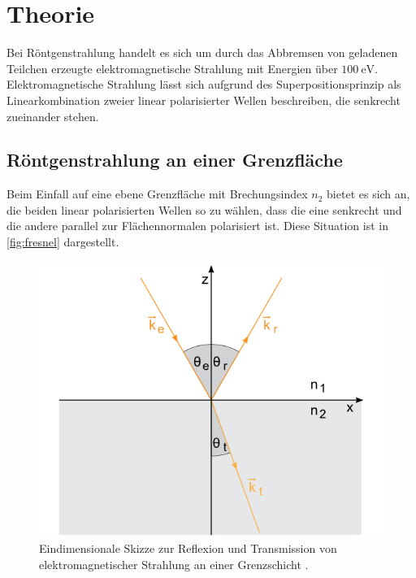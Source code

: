 \section{Theorie}
Bei Röntgenstrahlung handelt es sich um durch das Abbremsen von geladenen Teilchen erzeugte elektromagnetische Strahlung mit Energien über $\SI{100}{\electronvolt}$. Elektromagnetische Strahlung lässt sich aufgrund des Superpositionsprinzip als Linearkombination zweier linear polarisierter Wellen beschreiben, die senkrecht zueinander stehen.

\subsection{Röntgenstrahlung an einer Grenzfläche}
Beim Einfall auf eine ebene Grenzfläche mit Brechungsindex $n_2$ bietet es sich an, die beiden linear polarisierten Wellen so zu wählen, dass die eine senkrecht und die andere parallel zur Flächennormalen polarisiert ist. Diese Situation ist in \autoref{fig:fresnel} dargestellt.

\begin{figure}[H]
  \centering
  \includegraphics{fresnel.png}
  \caption{Eindimensionale Skizze zur Reflexion und Transmission von elektromagnetischer Strahlung an einer Grenzschicht \cite{fresnel}.}
  \label{fig:fresnel}
\end{figure}

